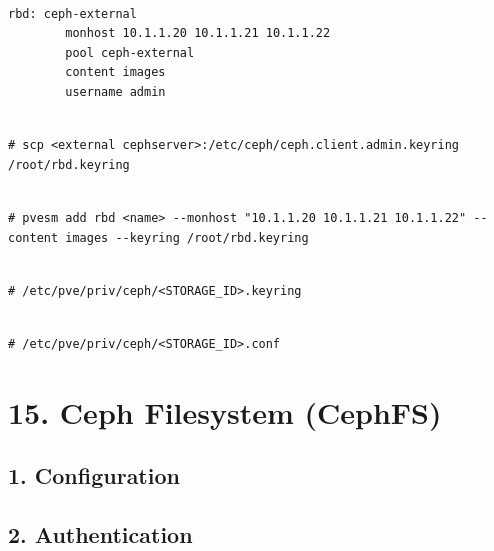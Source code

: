 \begin{lstlisting}

rbd: ceph-external
        monhost 10.1.1.20 10.1.1.21 10.1.1.22
        pool ceph-external
        content images
        username admin

\end{lstlisting}

\begin{lstlisting}

# scp <external cephserver>:/etc/ceph/ceph.client.admin.keyring /root/rbd.keyring

\end{lstlisting}

\begin{lstlisting}

# pvesm add rbd <name> --monhost "10.1.1.20 10.1.1.21 10.1.1.22" --content images --keyring /root/rbd.keyring

\end{lstlisting}

\begin{lstlisting}

# /etc/pve/priv/ceph/<STORAGE_ID>.keyring

\end{lstlisting}

\begin{lstlisting}

# /etc/pve/priv/ceph/<STORAGE_ID>.conf

\end{lstlisting}

\begin{table}[htbp]

\centering

\begin{tabular}

\end{tabular}

\end{table}


\section{15. Ceph Filesystem (CephFS)}

\subsection{1. Configuration}

\subsection{2. Authentication}

